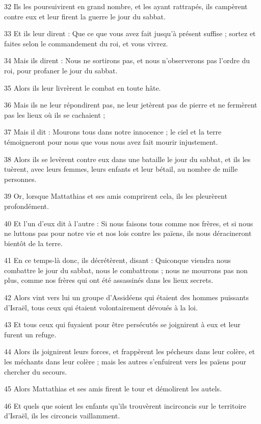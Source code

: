 \par 32 Ils les poursuivirent en grand nombre, et les ayant rattrapés, ils campèrent contre eux et leur firent la guerre le jour du sabbat.
\par 33 Et ils leur dirent : Que ce que vous avez fait jusqu'à présent suffise ; sortez et faites selon le commandement du roi, et vous vivrez.
\par 34 Mais ils dirent : Nous ne sortirons pas, et nous n'observerons pas l'ordre du roi, pour profaner le jour du sabbat.
\par 35 Alors ils leur livrèrent le combat en toute hâte.
\par 36 Mais ils ne leur répondirent pas, ne leur jetèrent pas de pierre et ne fermèrent pas les lieux où ils se cachaient ;
\par 37 Mais il dit : Mourons tous dans notre innocence ; le ciel et la terre témoigneront pour nous que vous nous avez fait mourir injustement.
\par 38 Alors ils se levèrent contre eux dans une bataille le jour du sabbat, et ils les tuèrent, avec leurs femmes, leurs enfants et leur bétail, au nombre de mille personnes.
\par 39 Or, lorsque Mattathias et ses amis comprirent cela, ils les pleurèrent profondément.
\par 40 Et l'un d'eux dit à l'autre : Si nous faisons tous comme nos frères, et si nous ne luttons pas pour notre vie et nos lois contre les païens, ils nous déracineront bientôt de la terre.
\par 41 En ce temps-là donc, ils décrétèrent, disant : Quiconque viendra nous combattre le jour du sabbat, nous le combattrons ; nous ne mourrons pas non plus, comme nos frères qui ont été assassinés dans les lieux secrets.
\par 42 Alors vint vers lui un groupe d'Assidéens qui étaient des hommes puissants d'Israël, tous ceux qui étaient volontairement dévoués à la loi.
\par 43 Et tous ceux qui fuyaient pour être persécutés se joignirent à eux et leur furent un refuge.
\par 44 Alors ils joignirent leurs forces, et frappèrent les pécheurs dans leur colère, et les méchants dans leur colère ; mais les autres s'enfuirent vers les païens pour chercher du secours.
\par 45 Alors Mattathias et ses amis firent le tour et démolirent les autels.
\par 46 Et quels que soient les enfants qu'ils trouvèrent incirconcis sur le territoire d'Israël, ils les circoncis vaillamment.
